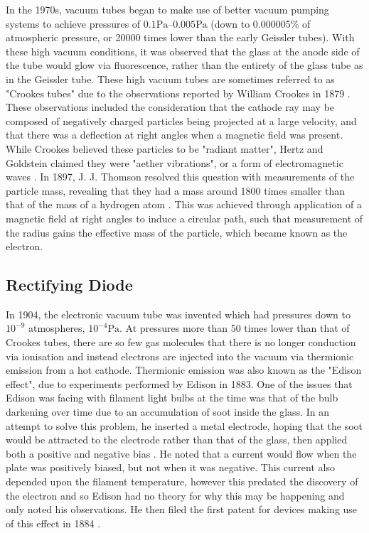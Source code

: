In the 1970s, vacuum tubes began to make use of better vacuum pumping systems to achieve pressures of $0.1\si{\pascal}$--$0.005\si{\pascal}$ (down to 0.000005\% of atmospheric pressure, or 20000 times lower than the early Geissler tubes). With these high vacuum conditions, it was observed that the glass at the anode side of the tube would glow via fluorescence, rather than the entirety of the glass tube as in the Geissler tube. These high vacuum tubes are sometimes referred to as "Crookes tubes" due to the observations reported by William Crookes in 1879 \cite{crookes1879}. These observations included the consideration that the cathode ray may be composed of negatively charged particles being projected at a large velocity, and that there was a deflection at right angles when a magnetic field was present. While Crookes believed these particles to be "radiant matter", Hertz and Goldstein claimed they were "aether vibrations", or a form of electromagnetic waves \cite{thomson:1903}. In 1897, J. J. Thomson resolved this question with measurements of the particle mass, revealing that they had a mass around 1800 times smaller than that of the mass of a hydrogen atom \cite{thomson:1901}. This was achieved through application of a magnetic field at right angles to induce a circular path, such that measurement of the radius gains the effective mass of the particle, which became known as the electron. 

\subsection{Rectifying Diode}
In 1904, the electronic vacuum tube was invented which had pressures down to $10^{-9}$ atmospheres, $10^{-4}\si{\pascal}$. At pressures more than 50 times lower than that of Crookes tubes, there are so few gas molecules that there is no longer conduction via ionisation and instead electrons are injected into the vacuum via thermionic emission from a hot cathode. Thermionic emission was also known as the "Edison effect", due to experiments performed by Edison in 1883. One of the issues that Edison was facing with filament light bulbs at the time was that of the bulb darkening over time due to an accumulation of soot inside the glass. In an attempt to solve this problem, he inserted a metal electrode, hoping that the soot would be attracted to the electrode rather than that of the glass, then applied both a positive and negative bias \cite{nebeker:2009}. He noted that a current would flow when the plate was positively biased, but not when it was negative. This current also depended upon the filament temperature, however this predated the discovery of the electron and so Edison had no theory for why this may be happening and only noted his observations. He then filed the first patent for devices making use of this effect in 1884 \cite{edison:1884}. 

